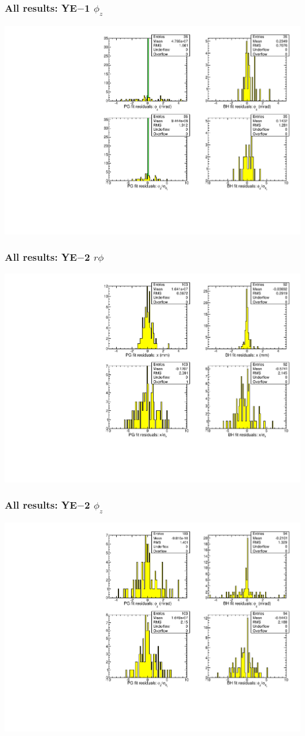 \documentclass[compress]{beamer}
\begin{document}
\begin{frame}
\frametitle{All results: YE$-$1 $\phi_z$}
\includegraphics[width=\linewidth]{newplots_fitresiduals_YEm1_phiz.pdf}
\end{frame}
\begin{frame}
\frametitle{All results: YE$-$2 $r\phi$}
\includegraphics[width=\linewidth]{newplots_fitresiduals_YEm2_x.pdf}
\end{frame}
\begin{frame}
\frametitle{All results: YE$-$2 $\phi_z$}
\includegraphics[width=\linewidth]{newplots_fitresiduals_YEm2_phiz.pdf}
\end{frame}
\end{document}
